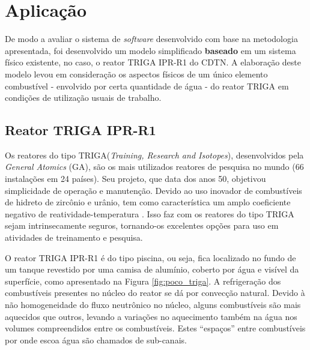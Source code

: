 \chapter{Aplicação}
\label{chap:aplicacao}

De modo a avaliar o sistema de \textit{software} desenvolvido com base na metodologia apresentada, 
foi desenvolvido um modelo simplificado \textbf{baseado} em um sistema físico existente, no caso,
o reator TRIGA IPR-R1 do CDTN. A elaboração deste modelo levou em consideração os aspectos físicos
de um único elemento combustível - envolvido por certa quantidade de água - do reator TRIGA
em condições de utilização usuais de trabalho.

\section{Reator TRIGA IPR-R1}
\label{sec:triga}


Os reatores do tipo TRIGA\textregistered (\textit{Training, Research and Isotopes}),
desenvolvidos pela \textit{General Atomics} (GA), são os mais utilizados
reatores de pesquisa no mundo (66 instalações em 24 países). Seu projeto, que data dos anos 50,
objetivou simplicidade de operação e manutenção. Devido ao uso inovador de combustíveis de hidreto
de zircônio e urânio, tem como característica um amplo coeficiente negativo
de reatividade-temperatura \cite[Capítulo~1]{Veloso2005}. Isso faz com os reatores do tipo TRIGA sejam
intrinsecamente seguros, tornando-os excelentes opções para uso em atividades de treinamento
e pesquisa.


O reator TRIGA IPR-R1 é do tipo piscina, ou seja, fica localizado no fundo de um tanque revestido por uma
camisa de alumínio, coberto por água e visível da superfície, como apresentado na Figura \ref{fig:poco_triga}.
A refrigeração dos combustíveis presentes no núcleo do reator se dá por convecção natural. Devido à não homogeneidade
do fluxo neutrônico no núcleo, alguns combustíveis são mais aquecidos que outros, levando a variações
no aquecimento também na água nos volumes compreendidos entre os combustíveis. Estes ``espaços'' entre
combustíveis por onde escoa água são chamados de sub-canais.

